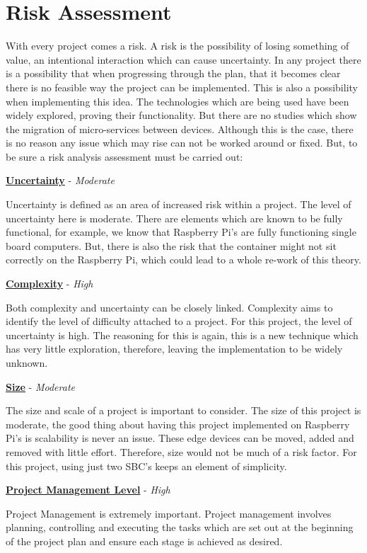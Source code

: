 \section{Risk Assessment}
With every project comes a risk. A risk is the possibility of losing something of value, an intentional interaction which can cause uncertainty. In any project there is a possibility that when progressing through the plan, that it becomes clear there is no feasible way the project can be implemented. This is also a possibility when implementing this idea. The technologies which are being used have been widely explored, proving their functionality. But there are no studies which show the migration of micro-services between devices. Although this is the case, there is no reason any issue which may rise can not be worked around or fixed. But, to be sure a risk analysis assessment must be carried out:

\textbf{ \underline {Uncertainty}} - \textit{Moderate}

Uncertainty is defined as an area of increased risk within a project. The level of uncertainty here is moderate. There are elements which are known to be fully functional, for example, we know that Raspberry Pi's are fully functioning single board computers. But, there is also the risk that the container might not sit correctly on the Raspberry Pi, which could lead to a whole re-work of this theory.

\textbf{\underline{Complexity}} - \textit{High}

Both complexity and uncertainty can be closely linked. Complexity aims to identify the level of difficulty attached to a project. For this project, the level of uncertainty is high. The reasoning for this is again, this is a new technique which has very little exploration, therefore, leaving the implementation to be widely unknown.

\pagebreak
\textbf{\underline{Size}} - \textit{Moderate}

The size and scale of a project is important to consider. The size of this project is moderate, the good thing about having this project implemented on Raspberry Pi's is scalability is never an issue. These edge devices can be moved, added and removed with little effort. Therefore, size would not be much of a risk factor. For this project, using just two SBC's keeps an element of simplicity.


\textbf{\underline{Project Management Level}} - \textit{High}

Project Management is extremely important. Project management involves planning, controlling and executing the tasks which are set out at the beginning of the project plan and ensure each stage is achieved as desired. 



